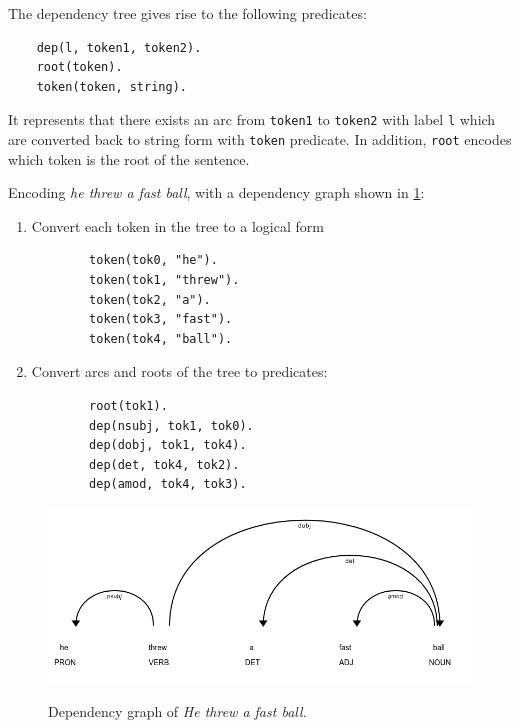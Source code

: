 The dependency tree gives rise to the following predicates:
\begin{verbatim}
    dep(l, token1, token2).
    root(token).
    token(token, string).
\end{verbatim}

It represents that there exists an arc from \verb_token1_ to \verb_token2_ with label \verb+l+ which are converted back to string form with \verb_token_ predicate.
In addition, \verb_root_ encodes which token is the root of the sentence.

\begin{example}
\label{logical-encoding-example}
Encoding \textit{he threw a fast ball}, with a dependency graph shown in \ref{example-dependency-graph}:
\begin{enumerate}
    \item Convert each token in the tree to a logical form
    \begin{verbatim}
        token(tok0, "he").
        token(tok1, "threw").
        token(tok2, "a").
        token(tok3, "fast").
        token(tok4, "ball").
    \end{verbatim}
    \item Convert arcs and roots of the tree to predicates:
    \begin{verbatim}
        root(tok1).
        dep(nsubj, tok1, tok0).
        dep(dobj, tok1, tok4).
        dep(det, tok4, tok2).
        dep(amod, tok4, tok3).
    \end{verbatim}
\end{enumerate}
\end{example} 

\begin{figure}[h]
\caption{Dependency graph of \emph{He threw a fast ball.}}
\centering
\includegraphics[width=\textwidth]{solving-nlp-tasks-logically/example_dependency_tree.png}
\label{example-dependency-graph}
\end{figure}

